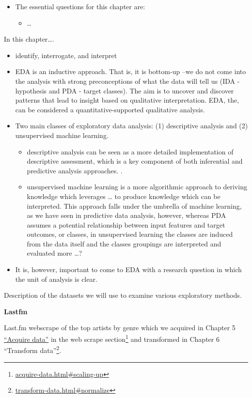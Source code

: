 \documentclass[
]{article}
\DeclareRobustCommand{\href}[2]{#2\footnote{\url{#1}}}
\providecommand{\tightlist}{%
  \setlength{\itemsep}{0pt}\setlength{\parskip}{0pt}}
\newenvironment{rmdblock}[1]
  {\begin{shaded*}
  \begin{itemize}
  \renewcommand{\labelitemi}{
    \raisebox{-.5\height}[0pt][0pt]{
      {\setkeys{Gin}{width=2em,keepaspectratio}\texttt{[image: assets/images/\#1]}}
    }
  }
  \item
  }
  {
  \end{itemize}
  \end{shaded*}
  }
\newenvironment{rmdkey}
  {\begin{rmdblock}{key}}
  {\end{rmdblock}}
\begin{document}
\begin{rmdkey}
The essential questions for this chapter are:

\begin{itemize}
\tightlist
\item
  \ldots{}
\end{itemize}
\end{rmdkey}

In this chapter\ldots.

\begin{itemize}
\item
  identify, interrogate, and interpret
\item
  EDA is an inductive approach. That is, it is bottom-up --we do not come into the analysis with strong preconceptions of what the data will tell us (IDA - hypothesis and PDA - target classes). The aim is to uncover and discover patterns that lead to insight based on qualitative interpretation. EDA, the, can be considered a quantitative-supported qualitative analysis.
\item
  Two main classes of exploratory data analysis: (1) descriptive analysis and (2) unsupervised machine learning.

  \begin{itemize}
  \tightlist
  \item
    descriptive analysis can be seen as a more detailed implementation of descriptive assessment, which is a key component of both inferential and predictive analysis approaches. .
  \item
    unsupervised machine learning is a more algorithmic approach to deriving knowledge which leverages \ldots{} to produce knowledge which can be interpreted. This approach falls under the umbrella of machine learning, as we have seen in predictive data analysis, however, whereas PDA assumes a potential relationship between input features and target outcomes, or classes, in unsupervised learning the classes are induced from the data itself and the classes groupings are interpreted and evaluated more \ldots?
  \end{itemize}
\item
  It is, however, important to come to EDA with a research question in which the unit of analysis is clear.
\end{itemize}

Description of the datasets we will use to examine various exploratory methods.

\textbf{Lastfm}

Last.fm webscrape of the top artists by genre which we acquired in Chapter 5 \protect\hyperlink{acquire-data}{``Acquire data''} in the \href{acquire-data.html\#scaling-up}{web scrape section} and transformed in Chapter 6 \href{transform-data.html\#normalize}{``Transform data''}.
\end{document}
